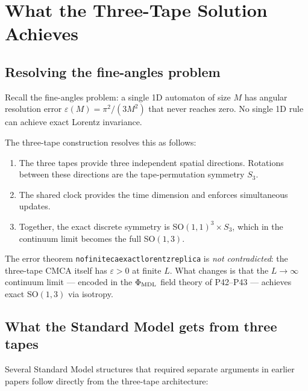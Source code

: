 \documentclass[11pt,a4paper]{article}
\newcommand{\lean}[1]{%
  \penalty-100
  \begingroup\def\_{\textunderscore\allowbreak}\texttt{#1}\endgroup}
\begin{document}
\section{What the Three-Tape Solution Achieves}
\label{sec:solves}

\subsection{Resolving the fine-angles problem}

Recall the fine-angles problem: a single 1D automaton of size $M$ has
angular resolution error $\varepsilon(M) = \pi^2/(3M^2)$ that never
reaches zero.  No single 1D rule can achieve exact Lorentz invariance.

The three-tape construction resolves this as follows:
\begin{enumerate}
  \item The three tapes provide three independent spatial directions.
        Rotations between these directions are the tape-permutation
        symmetry $S_3$.
  \item The shared clock provides the time dimension and enforces
        simultaneous updates.
  \item Together, the exact discrete symmetry is SO$(1,1)^3 \times S_3$,
        which in the continuum limit becomes the full SO$(1,3)$.
\end{enumerate}

The error theorem \lean{no\_finite\_ca\_exact\_lorentz\_replica} is
\emph{not contradicted}: the three-tape CMCA itself has $\varepsilon > 0$
at finite $L$.  What changes is that the $L \to \infty$ continuum limit
--- encoded in the $\Phi_{\rm MDL}$ field theory of P42--P43 --- achieves
exact SO$(1,3)$ via isotropy.

\subsection{What the Standard Model gets from three tapes}

Several Standard Model structures that required separate arguments in
earlier papers follow directly from the three-tape architecture:
\end{document}
